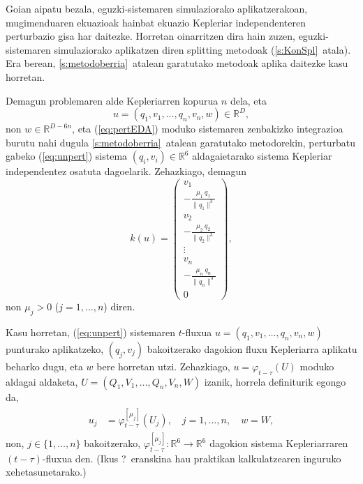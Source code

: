 Goian aipatu bezala, eguzki-sistemaren simulaziorako aplikatzerakoan,  mugimenduaren ekuazioak hainbat ekuazio Kepleriar independenteren
perturbazio gisa har daitezke.  Horretan oinarritzen dira hain zuzen, eguzki-sistemaren simulaziorako aplikatzen diren splitting metodoak (\ref{s:KonSpl}~atala).
Era berean, \ref{s:metodoberria}~atalean garatutako metodoak aplika daitezke kasu horretan.

Demagun problemaren alde Kepleriarren kopurua $n$ dela, eta
\begin{equation*}
u=(q_1,v_1,\ldots,q_n,v_n,w) \in \mathbb{R}^{D},
\end{equation*}
 non $w \in \mathbb{R}^{D-6 n}$, eta (\ref{eq:pertEDA}) moduko sistemaren zenbakizko integrazioa burutu nahi dugula  \ref{s:metodoberria}~atalean garatutako metodorekin, perturbatu gabeko (\ref{eq:unpert}) sistema $(q_i,v_i) \in \mathbb{R}^{6}$ aldagaietarako sistema Kepleriar independentez osatuta dagoelarik. Zehazkiago, demagun
%
\begin{equation}
\label{eq: n-pertEDA}
k(u) =
\left(\begin{array}{c}
               v_1 \\
             \displaystyle  - \frac{\mu_1 \ q_1}{\|q_1\|^3}\\
               v_2 \\
                \displaystyle  - \frac{\mu_2 \ q_2}{\|q_2\|^3}\\
                \vdots \\
                v_n\\
                \displaystyle  - \frac{\mu_n \ q_n}{\|q_n\|^3}\\
                               0
\end{array}\right),
\end{equation}
%
non $\mu_j>0$ ($j=1,\ldots,n$) diren.

Kasu horretan, (\ref{eq:unpert}) sistemaren $t$-fluxua $u=(q_1,v_1,\ldots,q_n,v_n,w)$ punturako aplikatzeko, $(q_j,v_j)$ bakoitzerako dagokion fluxu Kepleriarra
aplikatu beharko dugu, eta $w$ bere horretan utzi. Zehazkiago,
 $u = \varphi_{t-\tau}(U)$ moduko aldagai aldaketa, $U=(Q_1,V_1,\ldots,Q_n,V_n,W)$ izanik, horrela definiturik egongo da,
%
\begin{align}
\label{eq:aldfl2}
\begin{split}
u_j&= \varphi_{t-\tau}^{[\mu_j]}(U_j), \quad  j=1,\dots,n, \quad w = W,
\end{split}
\end{align}
%
non, $j \in \{1,\ldots,n\}$ bakoitzerako, $\varphi_{t-\tau}^{[\mu_j]}:\mathbb{R}^6 \to \mathbb{R}^6$ dagokion sistema Kepleriarraren $(t-\tau)$-fluxua den. (Ikus ?~eranskina hau praktikan kalkulatzearen inguruko xehetasunetarako.)


